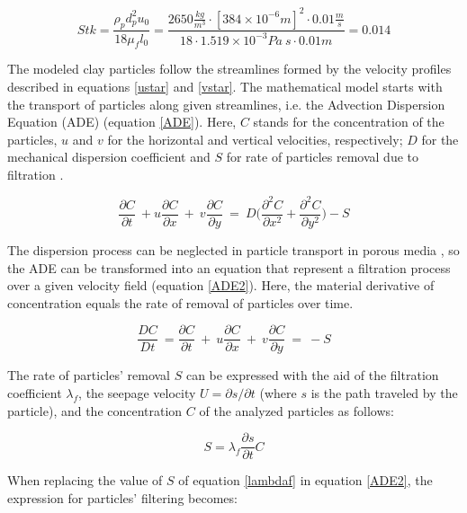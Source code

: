 \documentclass[draft,linenumbers]{agujournal2018}
\begin{document}
\begin{equation}
 \label{STK}
 	Stk = \frac{\rho_p d_p^2 u_0}{18 \mu_f l_0} = \frac{2650 \frac{kg}{m^3} \cdot [384 \times 10^{-6}m]^2 \cdot 0.01 \frac{m}{s}}{18 \cdot 1.519 \times 10^{-3}Pa \ s \cdot 0.01 m} = 0.014
 \end{equation}

The modeled clay particles follow the streamlines formed by the velocity profiles described in equations \ref{ustar} and \ref{vstar}. The mathematical model starts with the transport of particles along given streamlines, i.e. the Advection Dispersion Equation (ADE) (equation \ref{ADE}). Here, $C$ stands for the concentration of the particles, $u$ and $v$ for the horizontal and vertical velocities, respectively; $D$ for the mechanical dispersion coefficient and $S$ for rate of particles removal due to filtration \citep{Packman1997}.

\begin{equation}
 \label{ADE}
 	\frac{\partial C}{\partial t} \ + u \frac{\partial C}{\partial x} \ + \ v \frac{\partial C}{\partial y} \ = \ D \bigg(\frac{\partial^2 C}{\partial x^2} + \frac{\partial^2 C}{\partial y^2}\bigg) - S
\end{equation}

The dispersion process can be neglected in particle transport in porous media \citep{Mau1992}, so the ADE can be transformed into an equation that represent a filtration process over a given velocity field (equation \ref{ADE2}). Here, the material derivative of concentration equals the rate of removal of particles over time.

\begin{equation}
 \label{ADE2}
 	\frac{D C}{D t} \ = \frac{\partial C}{\partial t} \ + \ u \frac{\partial C}{\partial x} \ + \ v \frac{\partial C}{\partial y} \ = \ - S
\end{equation}

The rate of particles' removal $S$ can be expressed with the aid of the filtration coefficient $\lambda_f$, the seepage velocity $U = \partial s / \partial t$ (where $s$ is the path traveled by the particle), and the concentration $C$ of the analyzed particles as follows:

\begin{equation}
 \label{lambdaf}
 	S = \lambda_f \frac{\partial s}{\partial t}C
\end{equation}

When replacing the value of $S$ of equation \ref{lambdaf} in equation  \ref{ADE2}, the expression for particles' filtering becomes: 
\end{document}

